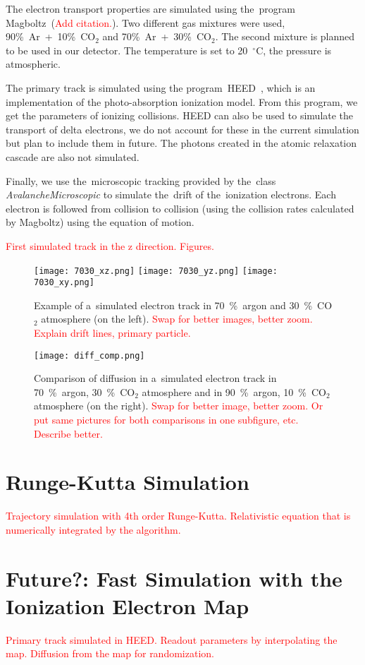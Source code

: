 		The electron transport properties are simulated using the~program Magboltz~(\textcolor{red}{Add citation.}). Two different gas mixtures were used, 90\%~Ar~+~10\%~CO$_2$ and 70\%~Ar~+~30\%~CO$_2$. The second mixture is planned to be used in our detector. The temperature is set to 20~$^\circ$C, the pressure is atmospheric.
		
		The primary track is simulated using the program~\ac{HEED}~\cite{HEED}, which is an implementation of the photo-absorption ionization model. From this program, we get the parameters of ionizing collisions. \ac{HEED} can also be used to simulate the transport of delta electrons, we do not account for these in the current simulation but plan to include them in future. The  photons created in the atomic relaxation cascade are also not simulated.
		
		Finally, we use the~microscopic tracking provided by the~class \textit{AvalancheMicroscopic} to simulate the~drift of the~ionization electrons. Each electron is followed from collision to collision (using the collision rates calculated by Magboltz) using the equation of motion.
		
		\textcolor{red}{First simulated track in the z direction. Figures.}
		
		\begin{figure}
			\centering
			\texttt{[image: 7030\_xz.png]}
			\texttt{[image: 7030\_yz.png]}
			\texttt{[image: 7030\_xy.png]}
			\caption{Example of a~simulated electron track in 70~\%~argon and 30~\%~CO$_2$ atmosphere (on the left). \textcolor{red}{Swap for better images, better zoom. Explain drift lines, primary particle.}}
			\label{fig:7030sim}
		\end{figure}
		
		\begin{figure}
			\centering
			\texttt{[image: diff\_comp.png]}
			\caption{Comparison of diffusion in a~simulated electron track in 70~\%~argon, 30~\%~CO$_2$ atmosphere and in 90~\%~argon, 10~\%~CO$_2$ atmosphere (on the right). \textcolor{red}{Swap for better image, better zoom. Or put same pictures for both comparisons in one subfigure, etc. Describe better.}}
			\label{fig:diffcomp}
		\end{figure}
	
	\section{Runge-Kutta Simulation}
	\label{sec:rks}
		\textcolor{red}{Trajectory simulation with 4th order Runge-Kutta. Relativistic equation that is numerically integrated by the algorithm.}
	
	\section{Future?: Fast Simulation with the Ionization Electron Map}
		\textcolor{red}{Primary track simulated in HEED. Readout parameters by interpolating the map. Diffusion from the map for randomization.}